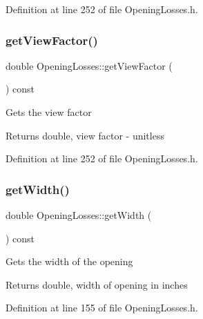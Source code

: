 Definition at line 252 of file Opening\+Losses.\+h.

\mbox{\label{class_opening_losses_ae6633fab7a941e00b9770bee6a3af34d}} 
\subsubsection{\texorpdfstring{get\+View\+Factor()}{getViewFactor()}\hspace{0.1cm}{\footnotesize\ttfamily [3/3]}}
{\footnotesize\ttfamily double Opening\+Losses\+::get\+View\+Factor (\begin{DoxyParamCaption}{ }\end{DoxyParamCaption}) const\hspace{0.3cm}{\ttfamily [inline]}}

Gets the view factor \begin{DoxyReturn}{Returns}
double, view factor -\/ unitless 
\end{DoxyReturn}


Definition at line 252 of file Opening\+Losses.\+h.

\mbox{\label{class_opening_losses_a0374aeac5532188358b5f6ad0f120305}} 
\subsubsection{\texorpdfstring{get\+Width()}{getWidth()}\hspace{0.1cm}{\footnotesize\ttfamily [1/3]}}
{\footnotesize\ttfamily double Opening\+Losses\+::get\+Width (\begin{DoxyParamCaption}{ }\end{DoxyParamCaption}) const\hspace{0.3cm}{\ttfamily [inline]}}

Gets the width of the opening \begin{DoxyReturn}{Returns}
double, width of opening in inches 
\end{DoxyReturn}


Definition at line 155 of file Opening\+Losses.\+h.

\mbox{\label{class_opening_losses_a0374aeac5532188358b5f6ad0f120305}} 
